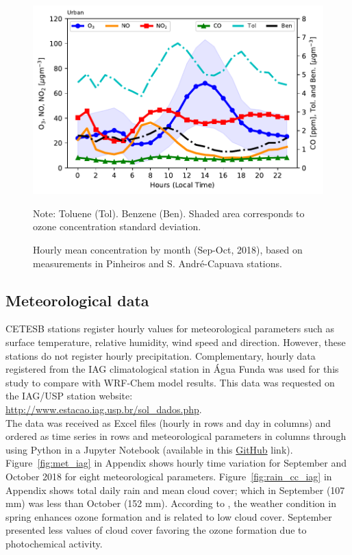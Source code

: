 	\begin{figure}[hbt]
		\begin{center}
			\includegraphics{fig/byhour_all_polls.pdf}
		\end{center}
  		\caption{Hourly mean concentration by month (Sep-Oct, 2018), based on measurements in Pinheiros and S. André-Capuava stations.\\}
  		{\scriptsize Note: Toluene (Tol). Benzene (Ben). Shaded area corresponds to ozone concentration standard deviation.}
  		\label{fig:hc_all_hour}
	\end{figure}

  
  \subsection{Meteorological data}
  CETESB stations register hourly values for meteorological parameters such as surface temperature, relative humidity, wind speed and direction.
  However, these stations do not register hourly precipitation.
  Complementary, hourly data registered from the IAG climatological station in Água Funda was used for this study to compare with WRF-Chem model results.
  This data was requested on the IAG/USP station website: \\ \url{http://www.estacao.iag.usp.br/sol_dados.php}.\\
  The data was received as Excel files (hourly in rows and day in columns) and ordered as time series in rows and meteorological parameters in columns through using Python in a Jupyter Notebook (available in this \href{https://github.com/adelgadop/IAG-met-processing}{GitHub} link).
  Figure~\ref{fig:met_iag} in Appendix shows hourly time variation for September and October 2018 for eight meteorological parameters.
  Figure~\ref{fig:rain_cc_iag} in Appendix shows total daily rain and mean cloud cover; which in September (107 mm) was less than October (152 mm).
  According to \citet{Carvalho2015}, the weather condition in spring enhances ozone formation and is related to low cloud cover.
  September presented less values of cloud cover favoring the ozone formation due to photochemical activity.
  
